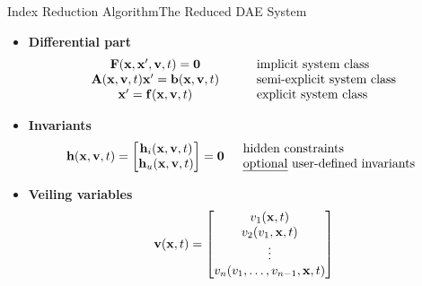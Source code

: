 
\begin{frame}{Index Reduction Algorithm}{The Reduced \acs{DAE} System}
  \vspace{-1.0em}
  \begin{itemize}[<+->]
    \item \textbf{Differential part}
    \begin{equation*}
      \begin{array}{ccl}
          \mathbf{F}(\mathbf{x}, \mathbf{x}^\prime, \mathbf{v}, t) = \mathbf{0} & \quad & \text{implicit  system class} \\
          \mathbf{A}(\mathbf{x}, \mathbf{v}, t) \mathbf{x}^\prime = \mathbf{b}(\mathbf{x}, \mathbf{v}, t) & \quad & \text{semi-explicit system class} \\
          \mathbf{x}^\prime = \mathbf{f}(\mathbf{x}, \mathbf{v}, t) & \quad & \text{explicit system class}
      \end{array}
    \end{equation*}
    \item \textbf{Invariants}
    \begin{equation*}
      \mathbf{h}(\mathbf{x}, \mathbf{v}, t) = \begin{bmatrix}
          \mathbf{h}_{i}(\mathbf{x}, \mathbf{v}, t) \\
          \mathbf{h}_{u}(\mathbf{x}, \mathbf{v}, t)
      \end{bmatrix} = \mathbf{0} \quad \begin{array}{l}
        \text{hidden constraints} \\
        \text{\emph{optional} user-defined invariants}
        \end{array}
    \end{equation*}
    \item \textbf{Veiling variables}
    \begin{equation*}
        \mathbf{v}(\mathbf{x}, t) = \begin{bmatrix}
            v_{1}(\mathbf{x}, t) \\
            v_{2}(v_{1}, \mathbf{x}, t) \\
            \vdots \\
            v_{n}(v_{1}, \dots, v_{n-1}, \mathbf{x}, t)
        \end{bmatrix}
    \end{equation*}
  \end{itemize}
\end{frame}

